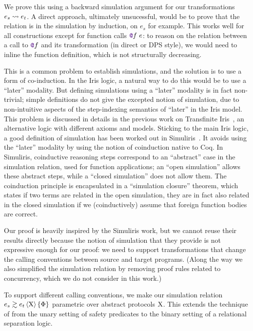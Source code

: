 We prove this using a backward simulation argument for our transformations $e_s \rightsquigarrow e_t$.
%
A direct approach, ultimately unsucessful, would be to prove that the relation is in the simulation by induction, on $e_s$ for example.
%
This works well for all constructions except for function calls $\lambdCall{\lambdFunc{f}}{e}$: to reason on the relation between a call to $\lambdFunc{f}$ and its transformation (in direct or DPS style), we would need to inline the function definition, which is not structurally decreasing.

This is a common problem to establish simulations, and the solution is to use a form of co-induction.
%
In the Iris logic, a natural way to do this would be to use a ``later'' modality.
%
But defining simulations using a ``later'' modality is in fact non-trivial; simple definitions do not give the excepted notion of simulation, due to non-intuitive aspects of the step-indexing semantics of ``later'' in the Iris model. This problem is discussed in details in the previous work on Transfinite Iris~\citep*{TODO-transfinite-Iris}, an alternative logic with different axioms and models.
%
Sticking to the main Iris logic, a good definition of simulation has been worked out in Simuliris~\citep*{TODO-Simuliris}.
%
It avoids using the ``later'' modality by using the notion of coinduction native to Coq. In Simuliris, coinductive reasoning steps correspond to an ``abstract'' case in the simulation relation, used for function applications; an ``open simulation'' allows these abstract steps, while a ``closed simulation'' does not allow them.
%
The coinduction principle is encapsulated in a ``simulation closure'' theorem, which states if two terms are related in the open simulation, they are in fact also related in the closed simulation if we (coinductively) assume that foreign function bodies are correct.

Our proof is heavily inspired by the Simuliris work, but we cannot reuse their results directly because the notion of simulation that they provide is not expressive enough for our proof: we need to support transformations that change the calling conventions between source and target programs.
%
(Along the way we also simplified the simulation relation by removing proof rules related to concurrency, which we do not consider in this work.)

To support different calling conventions, we make our simulation relation $\iSim[\Chi]{\Phi}{e_s}{e_t}$ parametric over abstract protocols $\mathrm{X}$. This extends the technique of \citet*{TODO-paulo} from the unary setting of safety predicates to the binary setting of a relational separation logic.

